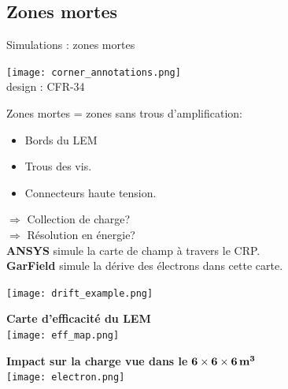   \subsection{Zones mortes}
    
    \begin{frame}{Simulations : zones mortes}
    	\begin{scriptsize}
    		\begin{minipage}{0.38\textwidth}
    			\begin{center}
    				\texttt{[image: corner\_annotations.png]}\\
    				design : CFR-34\\
    			\end{center} 
    			Zones mortes = zones sans trous d'amplification:
    			\begin{itemize}
    				\item Bords du LEM
    				\item Trous des vis.
    				\item Connecteurs haute tension.
    			\end{itemize}
    			$\Rightarrow$ Collection de charge?\\
    			$\Rightarrow$ Résolution en énergie?\\
    			
    			\textbf{ANSYS} simule la carte de champ à travers le CRP.\\
    			\textbf{GarField} simule la dérive des électrons dans cette carte.\\
    		\end{minipage}
    		\begin{minipage}{0.58\textwidth}
    			\centering
    			\texttt{[image: drift\_example.png]}\\
    			\vspace{0.5cm} \hspace{0.1cm}
    			\begin{minipage}{0.48\textwidth}
    				\centering
    				\textbf{Carte d'efficacité du LEM}\\
    				\texttt{[image: eff\_map.png]}
    			\end{minipage}\hfill
    			\begin{minipage}{0.48\textwidth}
    				\centering
    				\textbf{Impact sur la charge vue dans le} $\mathbf{6 \times 6 \times 6} \,\textbf{\si[detect-weight]{\meter\cubed}}$\\
    				\texttt{[image: electron.png]}
    			\end{minipage}
    		\end{minipage}
    	\end{scriptsize} 
    \end{frame}

